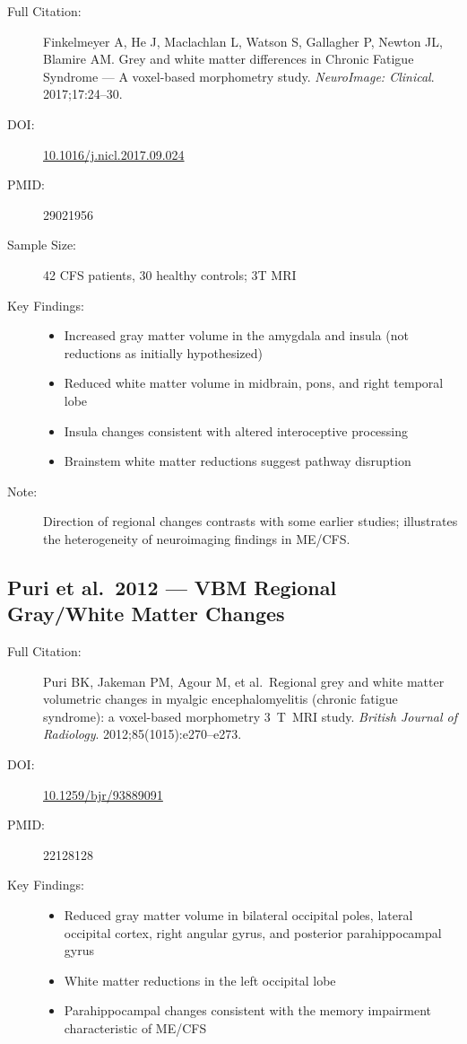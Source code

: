 \begin{description}
    \item[Full Citation:] Finkelmeyer A, He J, Maclachlan L, Watson S, Gallagher P, Newton JL, Blamire AM\@. Grey and white matter differences in Chronic Fatigue Syndrome --- A voxel-based morphometry study. \textit{NeuroImage: Clinical}. 2017;17:24--30.
    \item[DOI:] \href{https://doi.org/10.1016/j.nicl.2017.09.024}{10.1016/j.nicl.2017.09.024}
    \item[PMID:] 29021956
    \item[Sample Size:] 42 CFS patients, 30 healthy controls; 3T MRI
    \item[Key Findings:]
    \begin{itemize}
        \item Increased gray matter volume in the amygdala and insula (not reductions as initially hypothesized)
        \item Reduced white matter volume in midbrain, pons, and right temporal lobe
        \item Insula changes consistent with altered interoceptive processing
        \item Brainstem white matter reductions suggest pathway disruption
    \end{itemize}
    \item[Note:] Direction of regional changes contrasts with some earlier studies; illustrates the heterogeneity of neuroimaging findings in ME/CFS.
\end{description}

\subsection{Puri et al.\ 2012 --- VBM Regional Gray/White Matter Changes}

\begin{description}
    \item[Full Citation:] Puri BK, Jakeman PM, Agour M, et al.\ Regional grey and white matter volumetric changes in myalgic encephalomyelitis (chronic fatigue syndrome): a voxel-based morphometry 3~T~MRI study. \textit{British Journal of Radiology}. 2012;85(1015):e270--e273.
    \item[DOI:] \href{https://doi.org/10.1259/bjr/93889091}{10.1259/bjr/93889091}
    \item[PMID:] 22128128
    \item[Key Findings:]
    \begin{itemize}
        \item Reduced gray matter volume in bilateral occipital poles, lateral occipital cortex, right angular gyrus, and posterior parahippocampal gyrus
        \item White matter reductions in the left occipital lobe
        \item Parahippocampal changes consistent with the memory impairment characteristic of ME/CFS
    \end{itemize}
\end{description}


